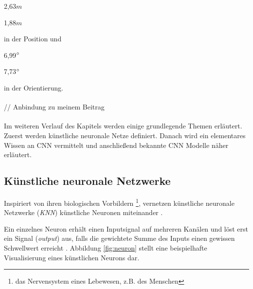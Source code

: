 \begin{enumerate*}[label=\alph*)]
	\addtocounter{enumi}{3}
	\item 2,63$m$
	\item 1,88$m$
\end{enumerate*}
in der Position und  
 \begin{enumerate*}[label=\alph*)]
 	\addtocounter{enumi}{3}
	\item 6,99$\degree$
	\item 7,73$\degree$
\end{enumerate*}
in der Orientierung.
\\\\// Anbindung zu meinem Beitrag
\\\\
Im weiteren Verlauf des Kapitels werden einige grundlegende Themen erläutert. Zuerst werden künstliche neuronale Netze definiert. Danach wird ein elementares Wissen an CNN vermittelt und anschließend bekannte CNN Modelle näher erläutert.


\subsection{Künstliche neuronale Netzwerke}
\label{sec:KNN}
Inspiriert von ihren biologischen Vorbildern \footnote{das Nervensystem eines Lebewesen, z.B. des Menschen}, vernetzen künstliche neuronale Netzwerke (\textit{KNN}) künstliche Neuronen miteinander \cite{CS231nConvolutionalNeural}.

Ein einzelnes Neuron erhält einen Inputsignal auf mehreren Kanälen und löst erst ein Signal (\textit{output}) aus, falls die gewichtete Summe des Inputs einen gewissen Schwellwert erreicht \cite{CS231nConvolutionalNeural}. Abbildung \ref{fig:neuron} stellt eine beispielhafte Visualisierung eines künstlichen Neurons dar.


